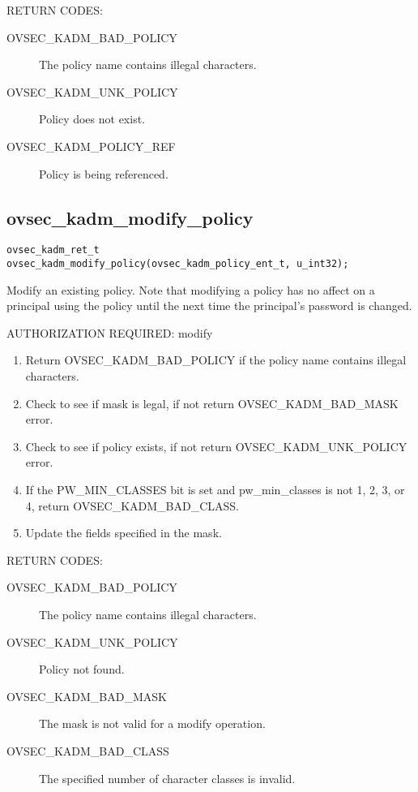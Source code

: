 RETURN CODES:

\begin{description}
\item[OVSEC_KADM_BAD_POLICY] The policy name contains illegal characters.
\item[OVSEC_KADM_UNK_POLICY] Policy does not exist.
\item[OVSEC_KADM_POLICY_REF] Policy is being referenced. 
\end{description}

\subsection{ovsec_kadm_modify_policy}

\begin{verbatim}
ovsec_kadm_ret_t
ovsec_kadm_modify_policy(ovsec_kadm_policy_ent_t, u_int32);
\end{verbatim}

Modify an existing policy.  Note that modifying a policy has no affect
on a principal using the policy until the next time the principal's
password is changed.

AUTHORIZATION REQUIRED: modify

\begin{enumerate}
\item Return OVSEC_KADM_BAD_POLICY if the policy name contains illegal
characters.
\item Check to see if mask is legal, if not return OVSEC_KADM_BAD_MASK error.
\item Check to see if policy exists, if not return
OVSEC_KADM_UNK_POLICY error.
\item If the PW_MIN_CLASSES bit is set and pw_min_classes is not 1, 2,
3, or 4, return OVSEC_KADM_BAD_CLASS.
\item Update the fields specified in the mask.
\end{enumerate}

RETURN CODES: 

\begin{description}
\item[OVSEC_KADM_BAD_POLICY] The policy name contains illegal characters.
\item[OVSEC_KADM_UNK_POLICY] Policy not found.
\item[OVSEC_KADM_BAD_MASK] The mask is not valid for a modify
operation.
\item[OVSEC_KADM_BAD_CLASS] The specified number of character classes
is invalid.
\end{description}

